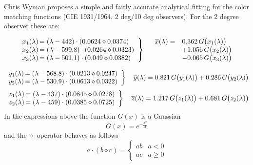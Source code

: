 Chris Wyman \citeyear{wyman13} proposes a simple
and fairly accurate analytical fitting for the color matching
functions (CIE 1931/1964, 2 deg/10 deg observers). For the 2 degree
observer these are:
{
\small
\noindent
\begin{equation}
\left.\begin{array}{r@{\,}l}
x_1(\lambda) &= (\lambda-442)   \cdot (0.0624 \diamond 0.0374) \\
x_2(\lambda) &= (\lambda-599.8) \cdot (0.0264 \diamond 0.0323) \\
x_3(\lambda) &= (\lambda-501.1) \cdot (0.049  \diamond 0.0382) \\
\end{array}\right\}\quad
\begin{array}{rl}
\overline{x}(\lambda) = & 0.362\,G\big(x_1(\lambda)\big) \\ 
                      &+ 1.056\,G\big(x_2(\lambda)\big) \\
                      &- 0.065\,G\big(x_3(\lambda)\big)
\end{array}
\end{equation}

\begin{equation}
\left.\begin{array}{r@{\,}l}
y_1(\lambda) &= (\lambda-568.8) \cdot (0.0213 \diamond 0.0247) \\
y_2(\lambda) &= (\lambda-530.9) \cdot (0.0613 \diamond 0.0322) \\
\end{array}\right\}\quad
\overline{y}(\lambda) =
   0.821\,G\big(y_1(\lambda)\big)
 + 0.286 \,G\big(y_2(\lambda)\big)
\end{equation}
\begin{equation}
\left.\begin{array}{r@{\,}l}
z_1(\lambda) &= (\lambda-437) \cdot (0.0845 \diamond 0.0278) \\
z_2(\lambda) &= (\lambda-459) \cdot (0.0385 \diamond 0.0725) \\
\end{array}\right\}\quad
\overline{z}(\lambda) =
   1.217\,G\big(z_1(\lambda)\big)
 + 0.681 \,G\big(z_2(\lambda)\big)
\end{equation}
In the expressions above the function $G(x)$ is a Gaussian
\begin{equation}
G(x) = e^{-\frac{x^2}{2}}
\end{equation}
and the $\diamond$ operator behaves as follows
\begin{equation}
a \cdot (b \diamond c) =
\begin{cases}
ab & a < 0 \\
ac & a \geq 0
\end{cases}
\end{equation}
}

